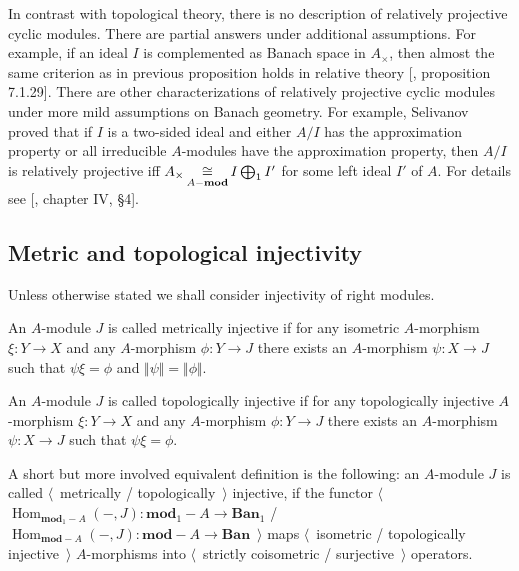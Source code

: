 In contrast with topological theory, there is no description of relatively projective cyclic modules. There are partial answers under additional assumptions. For example, if an ideal $I$ is complemented as Banach space in $A_\times$, then almost the same criterion as in previous proposition holds in relative theory [\cite{HelBanLocConvAlg}, proposition 7.1.29]. There are other characterizations of relatively projective cyclic modules under more mild assumptions on Banach geometry. For example, Selivanov proved that if $I$ is a two-sided ideal and either $A/I$ has the approximation property or all irreducible $A$-modules have the approximation property, then $A/I$ is relatively projective iff $A_\times\mathop{\mathbin{\cong}}\limits_{A-\mathbf{mod}}I\bigoplus_1 I'$ for some left ideal $I'$ of $A$. For details see [\cite{HelHomolBanTopAlg}, chapter IV, \S 4].




\subsection{Metric and topological injectivity}
\label{SubSectionMetricAndTopologicalInjectivity}

Unless otherwise stated we shall consider injectivity of right modules.

\begin{definition}\label{MetInjMod} An $A$-module $J$ is called metrically injective if for any isometric $A$-morphism $\xi:Y\to X$ and any $A$-morphism $\phi:Y\to J$ there exists an $A$-morphism $\psi:X\to J$ such that $\psi\xi=\phi$  and $\Vert\psi\Vert=\Vert\phi\Vert$.
\end{definition}

\begin{definition}\label{TopInjMod} An $A$-module $J$ is called  topologically injective if for any topologically injective $A$-morphism $\xi:Y\to X$ and any $A$-morphism $\phi:Y\to J$ there exists an $A$-morphism $\psi:X\to J$ such that $\psi\xi=\phi$.
\end{definition}

A short but more involved equivalent definition is the following: an $A$-module $J$ is called $\langle$~metrically / topologically~$\rangle$ injective, if the functor $\langle$~$\operatorname{Hom}_{\mathbf{mod}_1-A}(-,J):\mathbf{mod}_1-A\to\mathbf{Ban}_1$ / $\operatorname{Hom}_{\mathbf{mod}-A}(-,J):\mathbf{mod}-A\to\mathbf{Ban}$~$\rangle$ maps $\langle$~isometric / topologically injective~$\rangle$ $A$-morphisms into $\langle$~strictly coisometric / surjective~$\rangle$ operators.

